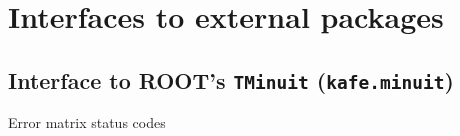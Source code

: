 \documentclass[a4paper,10pt,english]{sphinxmanual}
\begin{document}
\section{Interfaces to external packages}
\label{module_doc:interfaces-to-external-packages}

\subsection{Interface to ROOT's \texttt{TMinuit} (\texttt{kafe.minuit})}
\label{module_doc:module-kafe.minuit}\label{module_doc:interface-to-root-s-tminuit-kafe-minuit}\label{module_doc:module-minuit}

\begin{fulllineitems}
\label{module_doc:kafe.minuit.D_MATRIX_ERROR}
Error matrix status codes

\end{fulllineitems}

\end{document}
